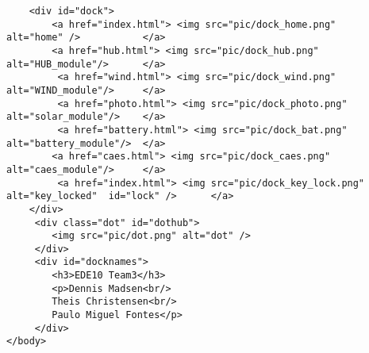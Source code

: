 \begin{lstlisting}
	<div id="dock">
     	<a href="index.html"> <img src="pic/dock_home.png" 		alt="home" /> 			</a>
      	<a href="hub.html"> <img src="pic/dock_hub.png" 		alt="HUB_module"/> 		</a>
         <a href="wind.html"> <img src="pic/dock_wind.png"		alt="WIND_module"/> 	</a>
         <a href="photo.html"> <img src="pic/dock_photo.png"		alt="solar_module"/> 	</a>
         <a href="battery.html"> <img src="pic/dock_bat.png" 	alt="battery_module"/>	</a>
     	<a href="caes.html"> <img src="pic/dock_caes.png" 		alt="caes_module"/> 	</a>
         <a href="index.html"> <img src="pic/dock_key_lock.png" 	alt="key_locked"  id="lock" /> 		</a>
	</div>
     <div class="dot" id="dothub">
     	<img src="pic/dot.png" alt="dot" />
     </div>
     <div id="docknames">
     	<h3>EDE10 Team3</h3>
     	<p>Dennis Madsen<br/>
     	Theis Christensen<br/>
     	Paulo Miguel Fontes</p>
     </div>
</body>
\end{lstlisting}